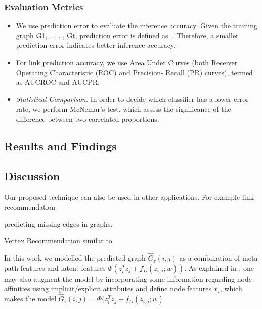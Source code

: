 \subsubsection{Evaluation Metrics}

\begin{itemize}
    \item We use prediction error to evaluate the inference accuracy. Given the training graph G1, . . . , Gt, prediction error is defined as... Therefore, a smaller prediction error indicates better inference accuracy.
    
    \item For link prediction accuracy, we use Area Under Curves
(both Receiver Operating Characteristic (ROC) and Precision-
Recall (PR) curves), termed as AUCROC and AUCPR.
    
     \item \textit{Statistical Comparison.} In order to decide which classifier has a lower error rate, we perform McNemar's test, which assess the significance of the difference between two correlated proportions.
   
    
\end{itemize}


\subsection{Results and Findings}


\subsection{Discussion}



Our proposed technique can also be used in other applications. For example link recommendation 


predicting missing edges in graphs.

Vertex Recommendation similar to \cite{ou2016asymmetric} 


In this work we modelled the predicted graph $ \hat{G}_\tau(i,j)$ as a combination of meta path features and latent features $\Phi(z_{i}^Tz_{j} + f_D(z_{i,j};w))$. As explained in \cite{*}, one may also augment the model by incorporating some information regarding node affinities using implicit/explicit attributes and define node features $x_i$, which makes the model $\hat{G}_\tau(i,j) = \Phi(z_{i}^Tz_{j} + f_D(z_{i,j};w)$

